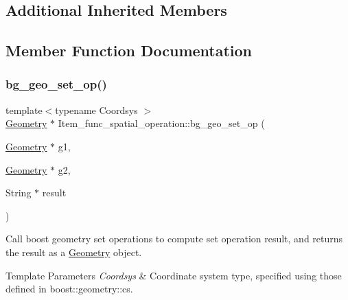 \subsection*{Additional Inherited Members}


\subsection{Member Function Documentation}
\mbox{\label{classItem__func__spatial__operation_a5adb62f7747c6e2ff52994d82d42d6c2}} 
\subsubsection{\texorpdfstring{bg\+\_\+geo\+\_\+set\+\_\+op()}{bg\_geo\_set\_op()}}
{\footnotesize\ttfamily template$<$typename Coordsys $>$ \\
\mbox{\hyperlink{classGeometry}{Geometry}} $\ast$ Item\+\_\+func\+\_\+spatial\+\_\+operation\+::bg\+\_\+geo\+\_\+set\+\_\+op (\begin{DoxyParamCaption}\item[{\mbox{\hyperlink{classGeometry}{Geometry}} $\ast$}]{g1,  }\item[{\mbox{\hyperlink{classGeometry}{Geometry}} $\ast$}]{g2,  }\item[{String $\ast$}]{result }\end{DoxyParamCaption})\hspace{0.3cm}{\ttfamily [protected]}}

Call boost geometry set operations to compute set operation result, and returns the result as a \mbox{\hyperlink{classGeometry}{Geometry}} object.


\begin{DoxyTemplParams}{Template Parameters}
{\em Coordsys} & Coordinate system type, specified using those defined in boost\+::geometry\+::cs. \\
\hline
\end{DoxyTemplParams}

